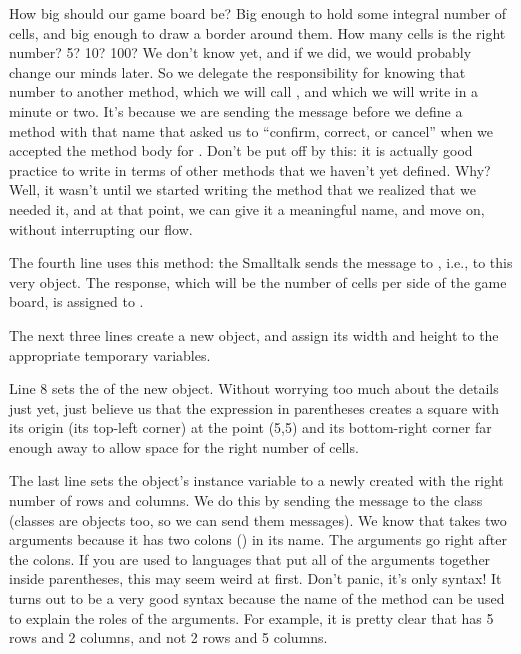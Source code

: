 \documentclass[a4paper,10pt,twoside]{book}
\begin{document}
How big should our game board be?  Big enough to hold some integral number of cells, and big enough to draw a border around them.
How many cells is the right number?  5? 10? 100? We don't know yet, and if we did, we would probably change our minds later.  So we delegate the responsibility for knowing that number to another method, which we will call , and which we will write in a minute or two.
It's because we are sending the  message before we define a method with that name that \pharo asked us to ``confirm, correct, or cancel'' when we accepted the method body for .
Don't be put off by this: it is actually good practice to write in terms of other methods that we haven't yet defined.
Why?  Well, it wasn't until we started writing the  method that we realized that we needed it, and at that point, we can give it a meaningful name, and move on, without interrupting our flow.
 
The fourth line uses this method: 
the Smalltalk  sends the message  to , i.e., to this very object.  
The response, which will be the number of cells per side of the game board, is assigned to .

The next three lines create a new  object, and assign its width and height to the appropriate temporary variables. 

Line 8 sets the  of the new object.
Without worrying too much about the details just yet, just believe us that the expression in parentheses creates a square with its origin (\ie its top-left corner) at the point (5,5) and its bottom-right corner far enough away to allow space for the right number of cells.

The last line sets the  object's instance variable  to a newly created  with the right number of rows and columns.   We do this by sending the message  to the  class (classes are objects too, so we can send them messages).  We know that  takes two arguments because it has two colons (\ct{:}) in its name.   The arguments go right after the colons.
If you are used to languages that put all of the arguments together inside parentheses, this may seem weird at first.  Don't panic, it's only syntax!
It turns out to be a very good syntax because the name of the method can be used to explain the roles of the arguments.  For example, it is pretty clear that  has 5 rows and 2 columns, and not 2 rows and 5 columns.
\end{document}
